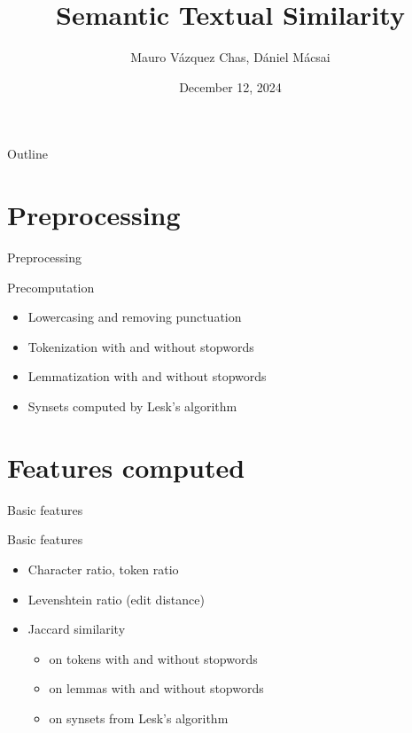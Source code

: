\documentclass{beamer}
\title[Semantic Textual Similarity]{Semantic Textual Similarity}
\author{Mauro Vázquez Chas, Dániel Mácsai}
\date{December 12, 2024}
\begin{document}
\begin{frame}
    \titlepage
\end{frame}

\begin{frame}{Outline}
    \tableofcontents
\end{frame}

\section{Preprocessing}
\begin{frame}{Preprocessing}
    \begin{block}{Precomputation}
        \begin{itemize}
            \item Lowercasing and removing punctuation
            \item Tokenization with and without stopwords
            \item Lemmatization with and without stopwords
            \item Synsets computed by Lesk's algorithm
        \end{itemize}
    \end{block}
\end{frame}

\section{Features computed}

\begin{frame}{Basic features}
    \begin{block}{Basic features}
        \begin{itemize}
            \item Character ratio, token ratio
            \item Levenshtein ratio (edit distance)
            \item Jaccard similarity
                \begin{itemize}
                    \item on tokens with and without stopwords 
                    \item on lemmas with and without stopwords
                    \item on synsets from Lesk's algorithm
                \end{itemize}   
        \end{itemize}
    \end{block}
\end{frame}
\end{document}
